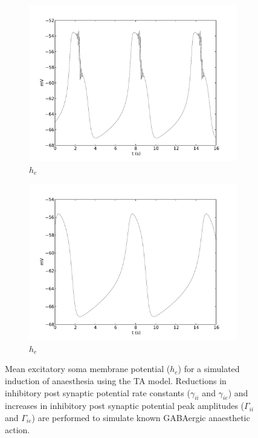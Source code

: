 \documentclass[a4paper,12pt]{article}
\begin{document}
\begin{figure}
\begin{subfigure}[b]{0.5\textwidth}
		\includegraphics[scale=0.35]{frontiers-2012-images-revised/effect_gamma_ee_yml-00143_ode-burst-thal-rev_yml-thal-rev-mod-1-1_1-1-save_yml-he-thal.pdf}
		\caption{$h_e$}
	\end{subfigure}
	\begin{subfigure}[b]{0.5\textwidth}
		\includegraphics[scale=0.35]{frontiers-2012-images-revised/effect_gamma_ee_yml-00143_ode-burst-thal-rev_yml-thal-rev-mod-1-1_3-1-save_yml-he-thal.pdf}
		\caption{$h_e$}
	\end{subfigure}
	\label{fig:00143}
	\caption{Mean excitatory soma membrane potential ($h_e$) for a simulated induction of anaesthesia using the TA model. 
Reductions in inhibitory post synaptic potential rate constants ($\gamma_{ii}$ and $\gamma_{ie}$) and increases in inhibitory post synaptic potential peak amplitudes ($\Gamma_{ii}$ and $\Gamma_{ie}$) are performed to simulate known GABAergic anaesthetic action.
}
\end{figure}
\end{document}
